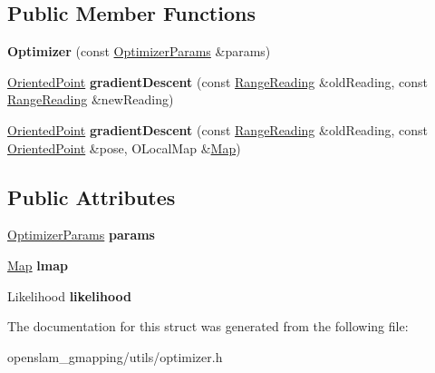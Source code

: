 \subsection*{Public Member Functions}
\begin{DoxyCompactItemize}
\item 
\mbox{\label{structGMapping_1_1Optimizer_a8163c2bfadfa1a0daf114a1c6ebb1643}} 
{\bfseries Optimizer} (const \hyperlink{structGMapping_1_1OptimizerParams}{Optimizer\+Params} \&params)
\item 
\mbox{\label{structGMapping_1_1Optimizer_aff3cf6db83bf2e7d0d1d6a01a35af639}} 
\hyperlink{structGMapping_1_1orientedpoint}{Oriented\+Point} {\bfseries gradient\+Descent} (const \hyperlink{classGMapping_1_1RangeReading}{Range\+Reading} \&old\+Reading, const \hyperlink{classGMapping_1_1RangeReading}{Range\+Reading} \&new\+Reading)
\item 
\mbox{\label{structGMapping_1_1Optimizer_a36fe94bbbd7568b1d96987e8abe6a6e2}} 
\hyperlink{structGMapping_1_1orientedpoint}{Oriented\+Point} {\bfseries gradient\+Descent} (const \hyperlink{classGMapping_1_1RangeReading}{Range\+Reading} \&old\+Reading, const \hyperlink{structGMapping_1_1orientedpoint}{Oriented\+Point} \&pose, O\+Local\+Map \&\hyperlink{classGMapping_1_1Map}{Map})
\end{DoxyCompactItemize}
\subsection*{Public Attributes}
\begin{DoxyCompactItemize}
\item 
\mbox{\label{structGMapping_1_1Optimizer_a1ae20dedafa9f218ac13382efe909b98}} 
\hyperlink{structGMapping_1_1OptimizerParams}{Optimizer\+Params} {\bfseries params}
\item 
\mbox{\label{structGMapping_1_1Optimizer_a29120879bc5716ecee37f530875892c3}} 
\hyperlink{classGMapping_1_1Map}{Map} {\bfseries lmap}
\item 
\mbox{\label{structGMapping_1_1Optimizer_ab36db0ba4116e589349101393fb23da2}} 
Likelihood {\bfseries likelihood}
\end{DoxyCompactItemize}


The documentation for this struct was generated from the following file\+:\begin{DoxyCompactItemize}
\item 
openslam\+\_\+gmapping/utils/optimizer.\+h\end{DoxyCompactItemize}
